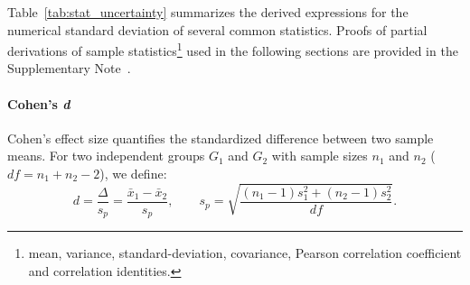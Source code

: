 Table~\ref{tab:stat_uncertainty} summarizes the derived expressions for the
numerical standard deviation of several common statistics. Proofs of partial
derivations of sample statistics\footnote{mean, variance, standard-deviation,
    covariance, Pearson correlation coefficient and correlation identities.} used
in the following sections are provided in the Supplementary
Note~.

\paragraph{Cohen's \textit{d}}

Cohen's effect size quantifies the standardized difference between two sample
means. For two independent groups $G_1$ and $G_2$ with sample sizes $n_1$ and
$n_2$ ($df = n_1 + n_2 - 2$), we define:
\begin{equation}
    d = \frac{\Delta}{s_p}
    = \frac{\bar{x}_1 - \bar{x}_2}{s_p},
    \qquad
    s_p = \sqrt{\frac{(n_1 - 1)s_1^2 + (n_2 - 1)s_2^2}{df}}.
    \label{eq:cohen-d-def}
\end{equation}

